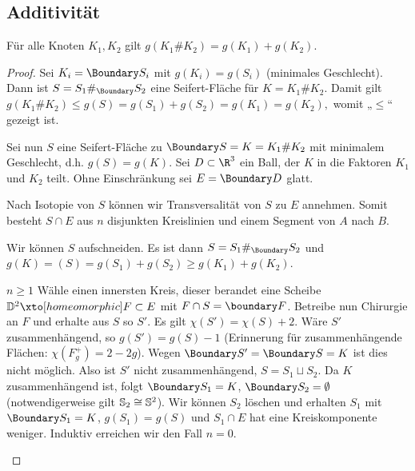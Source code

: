 
\subsection{Additivität}

\begin{st}
    Für alle Knoten $K_1, K_2$ gilt $g(K_1 \# K_2) = g(K_1) + g(K_2)$.
    \begin{proof}
        Sei $K_i = \Boundary S_i$ mit $g(K_i) = g(S_i)$ (minimales Geschlecht).
        Dann ist $S = S_1 \#_{\Boundary} S_2$ eine Seifert-Fläche für $K = K_1 \# K_2$.
        Damit gilt
        \begin{math}
            g(K_1 \# K_2) \le g(S) = g(S_1) + g(S_2) = g(K_1) = g(K_2),
        \end{math}
        womit „$\le$“ gezeigt ist.

        Sei nun $S$ eine Seifert-Fläche zu $\Boundary S = K = K_1 \# K_2$ mit minimalem Geschlecht, d.h. $g(S) = g(K)$.
        Sei $D \subset \R^3$ ein Ball, der $K$ in die Faktoren $K_1$ und $K_2$ teilt.
        Ohne Einschränkung sei $E = \Boundary D$ glatt.

        Nach Isotopie von $S$ können wir Transversalität von $S$ zu $E$ annehmen.
        Somit besteht $S \cap E$ aus $n$ disjunkten Kreislinien und einem Segment von $A$ nach $B$.
        \begin{seg}[$n = 0$]
            Wir können $S$ aufschneiden.
            Es ist dann $S = S_1 \#_{\Boundary} S_2$ und $g(K) = (S) = g(S_1) + g(S_2) \ge g(K_1) + g(K_2)$.
        \end{seg}
        \begin{seg}{$n \ge 1$}
            Wähle einen innersten Kreis, dieser berandet eine Scheibe $\D^2 \xto[homeomorphic] F \subset E$ mit $F \cap S = \boundary F$.
            Betreibe nun Chirurgie an $F$ und erhalte aus $S$ so $S'$.
            Es gilt $\chi(S') = \chi(S) + 2$.
            Wäre $S'$ zusammenhängend, so $g(S') = g(S) - 1$ (Erinnerung für zusammenhängende Flächen: $\chi(F_g^+) = 2 - 2g$).
            Wegen $\Boundary S' = \Boundary S = K$ ist dies nicht möglich.
            Also ist $S'$ nicht zusammenhängend, $S = S_1 \sqcup S_2$.
            Da $K$ zusammenhängend ist, folgt $\Boundary S_1 = K$, $\Boundary S_2 = \emptyset$ (notwendigerweise gilt $\mathbb { S }_2 \cong \mathbb { S }^2$).
            Wir können $S_2$ löschen und erhalten $S_1$ mit $\Boundary S_1 = K$, $g(S_1) = g(S)$ und $S_1 \cap E$ hat eine Kreiskomponente weniger.
            Induktiv erreichen wir den Fall $n = 0$.
        \end{seg}
    \end{proof}
\end{st}

